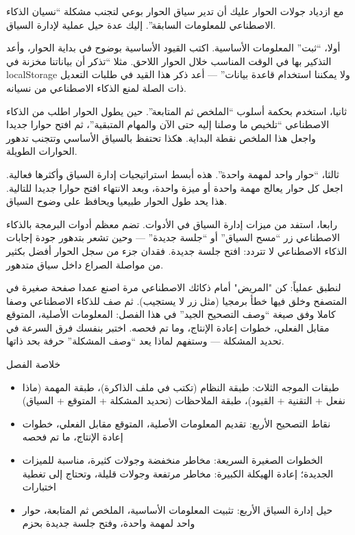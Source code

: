 مع ازدياد جولات الحوار عليك أن تدير سياق الحوار بوعي لتجنب مشكلة “نسيان الذكاء الاصطناعي للمعلومات السابقة”. إليك عدة حيل عملية لإدارة السياق.

أولا، “ثبت” المعلومات الأساسية. اكتب القيود الأساسية بوضوح في بداية الحوار، وأعد التذكير بها في الوقت المناسب خلال الحوار اللاحق. مثلا “تذكر أن بياناتنا مخزنة في localStorage ولا يمكننا استخدام قاعدة بيانات” — أعد ذكر هذا القيد في طلبات التعديل ذات الصلة لمنع الذكاء الاصطناعي من نسيانه.

ثانيا، استخدم بحكمة أسلوب “الملخص ثم المتابعة”. حين يطول الحوار اطلب من الذكاء الاصطناعي “تلخيص ما وصلنا إليه حتى الآن والمهام المتبقية”، ثم افتح حوارا جديدا واجعل هذا الملخص نقطة البداية. هكذا تحتفظ بالسياق الأساسي وتتجنب تدهور الحوارات الطويلة.

ثالثا، “حوار واحد لمهمة واحدة”. هذه أبسط استراتيجيات إدارة السياق وأكثرها فعالية. اجعل كل حوار يعالج مهمة واحدة أو ميزة واحدة، وبعد الانتهاء افتح حوارا جديدا للتالية. هذا يحد طول الحوار طبيعيا ويحافظ على وضوح السياق.

رابعا، استفد من ميزات إدارة السياق في الأدوات. تضم معظم أدوات البرمجة بالذكاء الاصطناعي زر “مسح السياق” أو “جلسة جديدة” — وحين تشعر بتدهور جودة إجابات الذكاء الاصطناعي لا تتردد: افتح جلسة جديدة. فقدان جزء من سجل الحوار أفضل بكثير من مواصلة الصراع داخل سياق متدهور.

\begin{tcbpractice}{لنطبق عملياً: كن "المريض" أمام ذكائك الاصطناعي مرة}
اصنع عمدا صفحة صغيرة في المتصفح وخلق فيها خطأ برمجيا (مثل زر لا يستجيب). ثم صف للذكاء الاصطناعي وصفا كاملا وفق صيغة “وصف التصحيح الجيد” في هذا الفصل: المعلومات الأصلية، المتوقع مقابل الفعلي، خطوات إعادة الإنتاج، وما تم فحصه. اختبر بنفسك فرق السرعة في تحديد المشكلة — وستفهم لماذا يعد “وصف المشكلة” حرفة بحد ذاتها.

\end{tcbpractice}

\begin{tcbsummary}{خلاصة الفصل}
\begin{itemize}
  \item طبقات الموجه الثلاث: طبقة النظام (تكتب في ملف الذاكرة)، طبقة المهمة (ماذا نفعل + التقنية + القيود)، طبقة الملاحظات (تحديد المشكلة + المتوقع + السياق)
  \item نقاط التصحيح الأربع: تقديم المعلومات الأصلية، المتوقع مقابل الفعلي، خطوات إعادة الإنتاج، ما تم فحصه
  \item الخطوات الصغيرة السريعة: مخاطر منخفضة وجولات كثيرة، مناسبة للميزات الجديدة؛ إعادة الهيكلة الكبيرة: مخاطر مرتفعة وجولات قليلة، وتحتاج إلى تغطية اختبارات
  \item حيل إدارة السياق الأربع: تثبيت المعلومات الأساسية، الملخص ثم المتابعة، حوار واحد لمهمة واحدة، وفتح جلسة جديدة بحزم
\end{itemize}

\end{tcbsummary}
